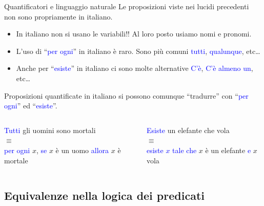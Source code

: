 \documentclass[aspectratio=169,10pt]{beamer}
\newcommand{\conn}[1]{\textcolor{blue}{#1}}
\newcommand{\quant}[1]{\textcolor{blue}{#1}}
\begin{document}
\begin{frame}{Quantificatori e linguaggio naturale}
    Le proposizioni viste nei lucidi precedenti non sono propriamente in italiano.
    \begin{itemize}
    \item In italiano non si usano le variabili!! Al loro posto usiamo nomi e pronomi.
    \item L'uso di ``\quant{per ogni}'' in italiano è raro. Sono più comuni \quant{tutti}, \quant{qualunque}, etc\ldots
    \item Anche per ``\quant{esiste}'' in italiano ci sono molte alternative \quant{C'è}, \quant{C'è almeno un}, etc\ldots
    \end{itemize}

    Proposizioni quantificate in italiano si possono comunque ``tradurre'' con ``\quant{per ogni}'' ed ``\quant{esiste}''.
    \begin{columns}
            \begin{example}
        \quant{Tutti} gli uomini sono mortali\\
        \medskip
        \hspace{1cm}$\equiv$\\
        \medskip
        \quant{per ogni} $x$, \conn{se} $x$ è un uomo \conn{allora} $x$ è mortale
    \end{example}
    \begin{example}
        \quant{Esiste} un elefante che vola\\
        \medskip
        \hspace{1cm}$\equiv$\\
        \medskip
        \quant{esiste $x$ tale che} $x$ è un elefante \conn{e} $x$ vola
    \end{example}
    \end{columns}
\end{frame}

\subsection{Equivalenze nella logica dei predicati}
\end{document}

